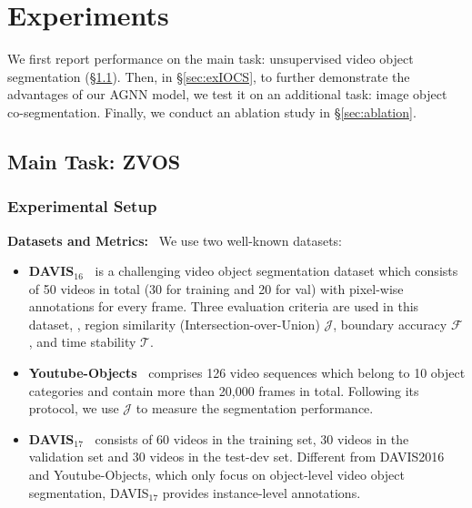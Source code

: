 \documentclass[10pt,twocolumn,letterpaper]{article}
\begin{document}
\vspace*{-4pt}
\section{Experiments}
	\vspace*{-2pt}	
We first report performance on the main task: {\color {black}unsupervised video object segmentation (\S\ref{sec:exUVOS})}. Then, in \S\ref{sec:exIOCS}, to further demonstrate the advantages of our AGNN model, we test it on an additional task: image object co-segmentation. Finally, we conduct an ablation study in \S\ref{sec:ablation}.
\vspace*{-3pt}
\subsection{Main Task: ZVOS}\label{sec:exUVOS}
\vspace*{-3pt}
\subsubsection{Experimental Setup}\label{sec:exUVOSimpl}
\vspace*{-6pt}
\noindent\textbf{Datasets and Metrics:}~ {\color{black}We use two well-known datasets:} \vspace*{-1pt}
\vspace*{-1pt}
\begin{itemize}[leftmargin=*]
	\setlength{\itemsep}{0pt}
	\setlength{\parsep}{-2pt}
	\setlength{\parskip}{-0pt}
	\setlength{\leftmargin}{-15pt}
	\vspace{-5pt}
	\item \textbf{DAVIS$_{16}$~\cite{perazzi2016benchmark}} is a challenging video object segmentation dataset which consists of 50 videos in total (30 for training and 20 for val) with pixel-wise annotations for every frame. Three evaluation criteria are used in this dataset, \ie, region similarity (Intersection-over-Union) $\mathcal{J}$, boundary accuracy $\mathcal{F}$, and time stability $\mathcal{T}$.
	


	\item \textbf{Youtube-Objects~\cite{DBLP:conf/cvpr/PrestLCSF12}} comprises 126 video sequences which belong to 10 object categories  and contain more than 20,000 frames in total. Following its protocol, we use $\mathcal{J}$ to measure the segmentation performance.
	\item \textbf{DAVIS$_{17}$~\cite{pont20172017}} consists of 60 videos in the training set, 30 videos in the validation set and 30 videos in the test-dev set. Different from DAVIS2016 and Youtube-Objects, which only focus on object-level video object segmentation, DAVIS$_{17}$ provides instance-level annotations.
\vspace*{-3pt}
\end{itemize}
\end{document}
